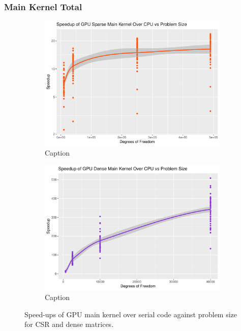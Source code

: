 \subsubsection{Main Kernel Total}

\begin{figure}
	\centering
	\begin{subfigure}{0.48\linewidth}
		\centering
		\includegraphics[width = \linewidth]{Plots/elems_p_assem_ker_cpu_sparse_speedup_vs_n}
		\caption{Caption}
		\label{fig:kern_sparse_n}
	\end{subfigure}\hfill
	\begin{subfigure}{0.48\linewidth}
		\centering
		\includegraphics[width=\linewidth]{Plots/elems_p_assem_ker_cpu_dense_speedup_vs_n}
		\caption{Caption}
		\label{fig:kern_dense_n}
	\end{subfigure}
	\caption{Speed-ups of GPU main kernel over serial code against problem size for CSR and dense matrices.}
	\label{fig:kern_su_n}
\end{figure}

